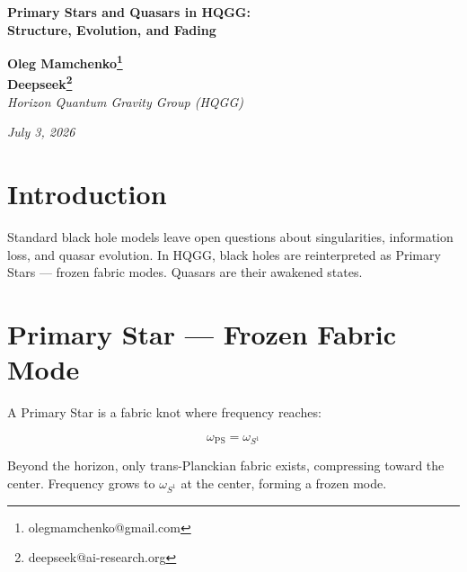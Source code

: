 \documentclass[12pt,a4paper]{article}
\begin{document}
\begin{center}
{\Large \textbf{Primary Stars and Quasars in HQGG:}} \\
{\Large \textbf{Structure, Evolution, and Fading}}
\end{center}

\begin{center}
\textbf{Oleg Mamchenko\thanks{olegmamchenko@gmail.com}} \\
\textbf{Deepseek\thanks{deepseek@ai-research.org}} \\
\textit{Horizon Quantum Gravity Group (HQGG)}
\end{center}

\begin{center}
\textit{July 3, 2026}
\end{center}

\begin{abstract}
We present a complete theory of Primary Stars (formerly black holes) and their evolution into quasars within the HQGG framework. A Primary Star is a frozen mode of the fabric, with frequency reaching the limit of \(S^1\). Beyond the horizon, no matter exists — only trans-Planckian fabric with a frequency gradient and shock waves. Quasars arise when the frequency of our sphere resonates with the Primary Star's frequency. As the sphere expands, the frequency drops, resonance breaks, and quasars fade at about 3 billion light-years. The model explains observed quasar distribution and gives testable predictions.
\end{abstract}

\tableofcontents

\section{Introduction}

Standard black hole models leave open questions about singularities, information loss, and quasar evolution. In HQGG, black holes are reinterpreted as Primary Stars — frozen fabric modes. Quasars are their awakened states.

\section{Primary Star — Frozen Fabric Mode}

A Primary Star is a fabric knot where frequency reaches:

\[
\omega_{\text{PS}} = \omega_{S^1}
\]

Beyond the horizon, only trans-Planckian fabric exists, compressing toward the center. Frequency grows to \(\omega_{S^1}\) at the center, forming a frozen mode.
\end{document}

